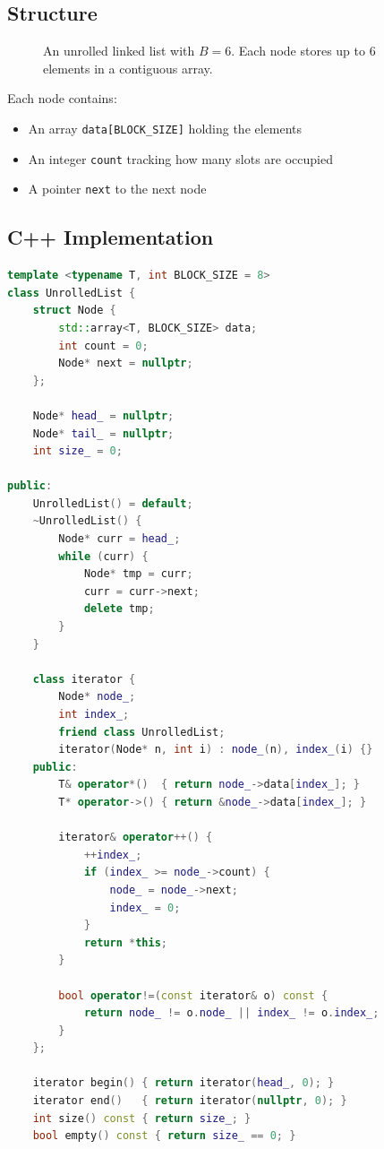 \subsection{Structure}

\begin{figure}[ht]
\centering
{}
\caption{An unrolled linked list with $B = 6$. Each node stores up to 6 elements in a contiguous array.}
\end{figure}

Each node contains:
\begin{itemize}
\item An array \texttt{data[BLOCK\_SIZE]} holding the elements
\item An integer \texttt{count} tracking how many slots are occupied
\item A pointer \texttt{next} to the next node
\end{itemize}

\subsection{C++ Implementation}

\begin{lstlisting}[language=C++]
template <typename T, int BLOCK_SIZE = 8>
class UnrolledList {
    struct Node {
        std::array<T, BLOCK_SIZE> data;
        int count = 0;
        Node* next = nullptr;
    };

    Node* head_ = nullptr;
    Node* tail_ = nullptr;
    int size_ = 0;

public:
    UnrolledList() = default;
    ~UnrolledList() {
        Node* curr = head_;
        while (curr) {
            Node* tmp = curr;
            curr = curr->next;
            delete tmp;
        }
    }

    class iterator {
        Node* node_;
        int index_;
        friend class UnrolledList;
        iterator(Node* n, int i) : node_(n), index_(i) {}
    public:
        T& operator*()  { return node_->data[index_]; }
        T* operator->() { return &node_->data[index_]; }

        iterator& operator++() {
            ++index_;
            if (index_ >= node_->count) {
                node_ = node_->next;
                index_ = 0;
            }
            return *this;
        }

        bool operator!=(const iterator& o) const {
            return node_ != o.node_ || index_ != o.index_;
        }
    };

    iterator begin() { return iterator(head_, 0); }
    iterator end()   { return iterator(nullptr, 0); }
    int size() const { return size_; }
    bool empty() const { return size_ == 0; }
\end{lstlisting}


